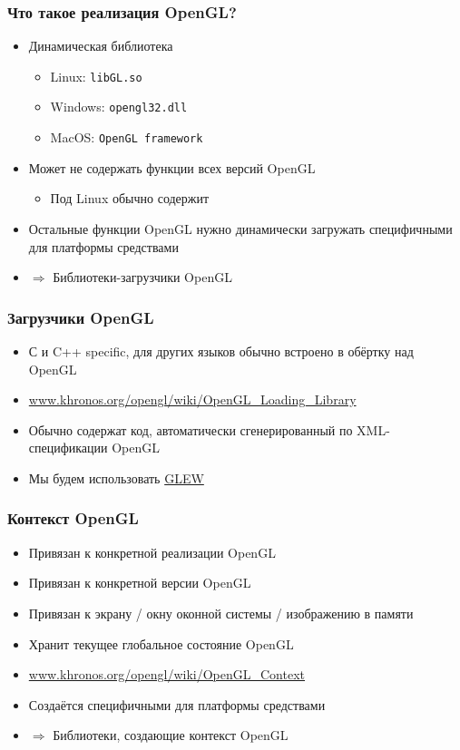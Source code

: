 \documentclass{beamer}
\begin{document}
\begin{frame}[fragile]
\frametitle{Что такое реализация OpenGL?}
\begin{itemize}
\item Динамическая библиотека
\begin{itemize}
\item Linux: \verb|libGL.so|
\item Windows: \verb|opengl32.dll|
\item MacOS: \verb|OpenGL framework|
\end{itemize}
\pause
\item Может не содержать функции всех версий OpenGL
\begin{itemize}
\item Под Linux обычно содержит
\end{itemize}
\item Остальные функции OpenGL нужно динамически загружать специфичными для платформы средствами
\item $\Longrightarrow$ Библиотеки-загрузчики OpenGL
\end{itemize}
\end{frame}

\begin{frame}
\frametitle{Загрузчики OpenGL}
\begin{itemize}
\item С и C++ specific, для других языков обычно встроено в обёртку над OpenGL
\item \url{www.khronos.org/opengl/wiki/OpenGL_Loading_Library}
\item Обычно содержат код, автоматически сгенерированный по XML-спецификации OpenGL
\item Мы будем использовать {\color{blue}\underline{GLEW}}
\end{itemize}
\end{frame}

\begin{frame}
\frametitle{Контекст OpenGL}
\begin{itemize}
\item Привязан к конкретной реализации OpenGL
\item Привязан к конкретной версии OpenGL
\item Привязан к экрану / окну оконной системы / изображению в памяти
\item Хранит текущее глобальное состояние OpenGL
\item \url{www.khronos.org/opengl/wiki/OpenGL_Context}
\item Создаётся специфичными для платформы средствами
\item $\Longrightarrow$ Библиотеки, создающие контекст OpenGL
\end{itemize}
\end{frame}
\end{document}
